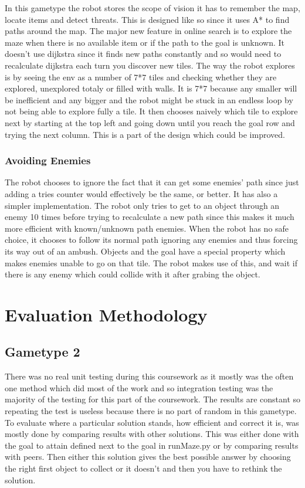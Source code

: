 \documentclass{cs255}
\begin{document}
In this gametype the robot stores the scope of vision it has to remember the map, locate items and detect threats.
This is designed like so since it uses A* to find paths around the map.
The major new feature in online search is to explore the maze when there is no available item or if the path to the goal is unknown.
It doesn't use dijkstra since it finds new paths constantly and so would need to recalculate dijkstra each turn you discover new tiles.
The way the robot explores is by seeing the env as a number of 7*7 tiles and checking whether they are explored, unexplored totaly or filled with walls.
It is 7*7 because any smaller will be inefficient and any bigger and the robot might be stuck in an endless loop by not being able to explore fully a tile.
It then chooses naively which tile to explore next by starting at the top left and going down until you reach the goal row and trying the next column.
This is a part of the design which could be improved.

\subsubsection{Avoiding Enemies}

The robot chooses to ignore the fact that it can get some enemies' path since just adding a tries counter would effectively be the same, or better.
It has also a simpler implementation.
The robot only tries to get to an object through an enemy 10 times before trying to recalculate a new path since this makes it much more efficient with known/unknown path enemies.
When the robot has no safe choice, it chooses to follow its normal path ignoring any enemies and thus forcing its way out of an ambush.
Objects and the goal have a special property which makes enemies unable to go on that tile.
The robot makes use of this, and wait if there is any enemy which could collide with it after grabing the object.

\section{Evaluation Methodology}

\subsection{Gametype 2}

There was no real unit testing during this coursework as it mostly was the often one method which did most of the work and so integration testing was the majority of the testing for this part of the coursework.
The results are constant so repeating the test is useless because there is no part of random in this gametype.
To evaluate where a particular solution stands, how efficient and correct it is, was mostly done by comparing results with other solutions.
This was either done with the goal to attain defined next to the goal in runMaze.py or by comparing results with peers.
Then either this solution gives the best possible answer by choosing the right first object to collect or it doesn't and then you have to rethink the solution.
\end{document}
